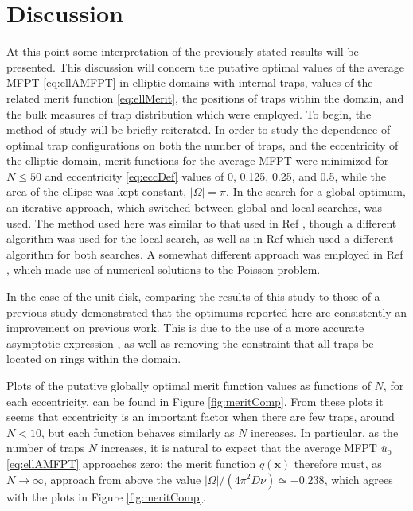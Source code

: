 \documentclass[11pt,letter,subeqn,fleqn]{article}
\newcommand{\amfpt}{\overline{u}_0} %
\newcommand{\trapLoc}{\mathbf{x}}   %
\newcommand{\domMeas}{|\Omega|}     %
\newcommand{\meritFunc}{q}          %
\begin{document}
\section{Discussion} \label{sec:discussion}


At this point some interpretation of the previously stated results will be presented. This discussion will concern the putative optimal values of the average MFPT \eqref{eq:ellAMFPT} in elliptic domains with internal traps, values of the related merit function \eqref{eq:ellMerit}, the positions of traps within the domain, and the bulk measures of trap distribution which were employed. To begin, the method of study will be briefly reiterated. In order to study the dependence of optimal trap configurations on both the number of traps, and the eccentricity of the elliptic domain, merit functions for the average MFPT were minimized for $N \leq 50$ and eccentricity \eqref{eq:eccDef} values of 0, 0.125, 0.25, and 0.5, while the area of the ellipse was kept constant, $\domMeas = \pi$. In the search for a global optimum, an iterative approach, which switched between global and local searches, was used. The method used here was similar to that used in Ref \cite{iyaniwura2020optimization}, though a different algorithm was used for the local search, as well as in Ref \cite{gilbert2019globally} which used a different algorithm for both searches. A somewhat different approach was employed in Ref \cite{iyaniwura2019simulation}, which made use of numerical solutions to the Poisson problem.

In the case of the unit disk, comparing the results of this study to those of a previous study \cite{kolokolnikov2005optimizing} demonstrated that the optimums reported here are consistently an improvement on previous work. This is due to the use of a more accurate asymptotic expression \cite{iyaniwura2020optimization}, as well as removing the constraint that all traps be located on rings within the domain.

Plots of the putative globally optimal merit function values as functions of $N$, for each eccentricity, can be found in Figure \ref{fig:meritComp}. From these plots it seems that eccentricity is an important factor when there are few traps, around $N < 10$, but each function behaves similarly as $N$ increases. In particular, as the number of traps $N$ increases, it is natural to expect that the average MFPT $\amfpt$ \eqref{eq:ellAMFPT} approaches zero; the merit function $\meritFunc(\trapLoc)$ therefore must, as $N\to \infty$, approach from above the value $\domMeas / (4\pi^2 D\nu) \simeq -0.238$, which agrees with the plots in Figure \ref{fig:meritComp}.
\end{document}
